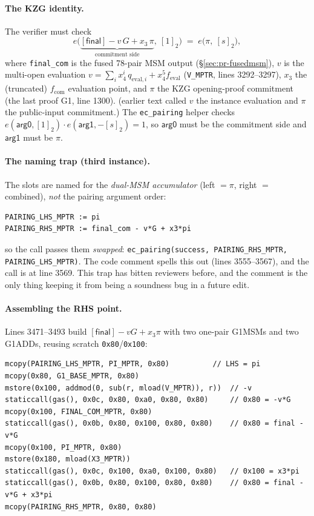 \paragraph{The KZG identity.} The verifier must check
\begin{equation}
e\!\big(\underbrace{[\mathsf{final}]-v\,G+x_3\,\pi}_{\text{commitment side}},\ [1]_2\big)
\;=\;
e\!\big(\pi,\ [s]_2\big),
\label{eq:pr-kzg-final}
\end{equation}
where \texttt{final\_com} is the fused 78-pair MSM output
(\S\ref{sec:pr-fusedmsm}), $v$ is the multi-open evaluation
$v=\sum_i x_4^i\,q_{\mathrm{eval},i}+x_4^5 f_\text{eval}$ (\texttt{V\_MPTR},
lines 3292--3297), $x_3$ the (truncated) $f_\text{com}$ evaluation
point, and $\pi$ the KZG opening-proof commitment (the last proof G1,
line 1300).  (earlier text called $v$ the instance
evaluation and $\pi$ the public-input commitment.)
The \texttt{ec\_pairing} helper checks
$e(\mathsf{arg0},[1]_2)\cdot e(\mathsf{arg1},-[s]_2)=1$, so
$\mathsf{arg0}$ must be the commitment side and $\mathsf{arg1}$
must be $\pi$.

\paragraph{The naming trap (third instance).} The slots are named for
the \emph{dual-MSM accumulator} (left $=\pi$, right $=$ combined),
\emph{not} the pairing argument order:
\begin{lstlisting}[style=plain]
PAIRING_LHS_MPTR := pi
PAIRING_RHS_MPTR := final_com - v*G + x3*pi
\end{lstlisting}
so the call passes them \emph{swapped}:
\texttt{ec\_\allowbreak{}pairing(success, PAIRING\_\allowbreak{}RHS\_\allowbreak{}MPTR, PAIRING\_\allowbreak{}LHS\_\allowbreak{}MPTR)}.
The code comment spells this out (lines 3555--3567), and the call is
at line 3569. This trap has bitten reviewers before, and the comment is
the only thing keeping it from being a soundness bug in a future edit.

\paragraph{Assembling the RHS point.} Lines 3471--3493 build
$[\mathsf{final}]-vG+x_3\pi$ with two one-pair G1MSMs and two
G1ADDs, reusing scratch \texttt{0x80}/\texttt{0x100}:
\begin{lstlisting}[style=yul]
mcopy(PAIRING_LHS_MPTR, PI_MPTR, 0x80)          // LHS = pi
mcopy(0x80, G1_BASE_MPTR, 0x80)
mstore(0x100, addmod(0, sub(r, mload(V_MPTR)), r))  // -v
staticcall(gas(), 0x0c, 0x80, 0xa0, 0x80, 0x80)     // 0x80 = -v*G
mcopy(0x100, FINAL_COM_MPTR, 0x80)
staticcall(gas(), 0x0b, 0x80, 0x100, 0x80, 0x80)    // 0x80 = final - v*G
mcopy(0x100, PI_MPTR, 0x80)
mstore(0x180, mload(X3_MPTR))
staticcall(gas(), 0x0c, 0x100, 0xa0, 0x100, 0x80)   // 0x100 = x3*pi
staticcall(gas(), 0x0b, 0x80, 0x100, 0x80, 0x80)    // 0x80 = final - v*G + x3*pi
mcopy(PAIRING_RHS_MPTR, 0x80, 0x80)
\end{lstlisting}

